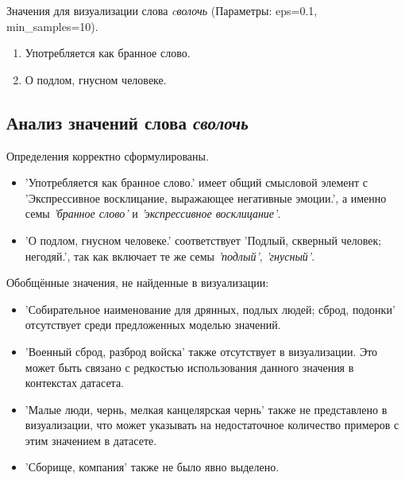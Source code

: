 Значения для визуализации слова \textit{cволочь} (Параметры: eps=0.1, min\_samples=10).

\begin{enumerate}
    \item Употребляется как бранное слово.
    \item О подлом, гнусном человеке.
\end{enumerate}

\subsection*{Анализ значений слова \textit{сволочь}}

Определения корректно сформулированы.

\begin{itemize}
    \item ’Употребляется как бранное слово.’ имеет общий смысловой элемент с
’Экспрессивное восклицание, выражающее негативные эмоции.’,
а именно семы \textit{’бранное слово’} и \textit{’экспрессивное восклицание’}.

    \item ’О подлом, гнусном человеке.’ соответствует
    ’Подлый, скверный человек; негодяй.’, так как включает те же семы \textit{’подлый’}, \textit{’гнусный’}.
\end{itemize}


Обобщённые значения, не найденные в визуализации:
\begin{itemize}
    \item ’Собирательное наименование для дрянных, подлых людей; сброд, подонки’ отсутствует среди предложенных моделью значений.

    \item ’Военный сброд, разброд войска’ также отсутствует в визуализации.
Это может быть связано с редкостью использования данного значения в контекстах датасета.

    \item ’Малые люди, чернь, мелкая канцелярская чернь’ также не представлено в визуализации,
что может указывать на недостаточное количество примеров с этим значением в датасете.

    \item ’Сборище, компания’ также не было явно выделено.
\end{itemize}

